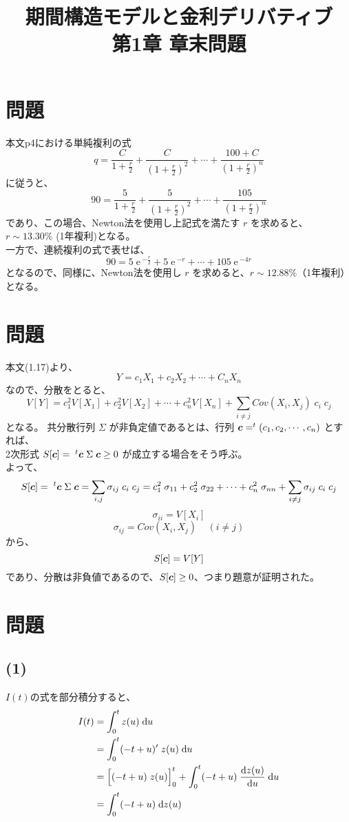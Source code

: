 \documentclass[a4j,10pt,oneside,openany]{jsbook}
\title{{\Huge \textbf{期間構造モデルと金利デリバティブ}}\\ {\small 第1章 \; 章末問題}}
\date{}
\newcommand{\diff}{\mathrm{d}}  %
\newcommand{\mexp}{\; \mathrm{e}\,}
\newcommand{\bvec}[1]{\mbox{\boldmath $#1$}} %
\begin{document}
%
%
\maketitle
%
%


\section*{問題 }
本文p4における単純複利の式
\[  q = \frac{C}{1+\frac{r}{2}} + \frac{C}{(1+\frac{r}{2})^2} + \cdots + \frac{100+C}{(1+\frac{r}{2})^n} \]
に従うと、
\[ 90 = \frac{5}{1+\frac{r}{2}} + \frac{5}{(1+\frac{r}{2})^2} + \cdots + \frac{105}{(1+\frac{r}{2})^n} \]
であり、この場合、Newton法を使用し上記式を満たす $r$ を求めると、$r \sim 13.30 \%$ (1年複利)となる。
\\
一方で、連続複利の式で表せば、
\[ 90 = 5 \mexp ^{-\frac{r}{2}} + 5 \mexp ^{-r} + \cdots + 105 \mexp ^{-4r} \]
となるので、同様に、Newton法を使用し $r$ を求めると、$r \sim 12.88 \%$（1年複利）となる。
\vspace{2\baselineskip}

\section*{問題 }
本文(1.17)より、
\[ Y = c_1 X_1 + c_2 X_2 + \cdots +C_n X_n \]
なので、分散をとると、
\[ V[Y] = c_{1}^{2} V[X_1] + c_{2}^{2} V[X_2] + \cdots + c_{n}^{2} V[X_n]+ \sum_{i \neq j } Cov(X_i , X_j) \; c_{i} \; c_{j} \]
となる。
共分散行列 $\Sigma$ が非負定値であるとは、行列 $\bvec{c} = ^{t} (c_1,c_2, \cdots , c_n)$ とすれば、\\
2次形式 $S[\bvec{c}] = \; ^{t} \bvec{c} \; \Sigma \; \bvec{c} \geq 0 $ が成立する場合をそう呼ぶ。\\
よって、
\[ S[\bvec{c}] = \; ^{t} \bvec{c} \; \Sigma \; \bvec{c} = \sum_{i,j} \sigma_{ij} \; c_{i} \; c_{j} =
c_{1}^{2} \; \sigma_{11} + c_{2}^{2} \; \sigma_{22} + \cdots + c_{n}^{2} \; \sigma_{nn}+ \sum_{i \neq j } \sigma_{ij} \; c_{i} \; c_{j} \]
\[ \sigma_{ii} = V[X_i] \]
\[ \sigma_{ij} = Cov(X_i , X_j) \; \; \; \; (i \neq j)\]
から、
\[ S[\bvec{c}] = V[Y] \]
であり、分散は非負値であるので、$S[\bvec{c}] \geq 0 $、つまり題意が証明された。
\vspace{2\baselineskip}

\section*{問題 }
\subsection*{(1)}
$I(t)$の式を部分積分すると、
\begin{align*}
 I(t)	&= \int^{t}_{0} z(u) \; {\diff}u \\
	&= \int^{t}_{0} (-t + u)^{\prime} \; z(u) \; {\diff}u \\
	&= \Big{[} (-t + u) \; z(u) \Big{]}^{t}_{0} + \int^{t}_{0} (-t + u) \; \frac{{\diff}z(u)}{{\diff}u} \; {\diff}u \\
	&= \int^{t}_{0} (-t + u) \; {\diff}z(u)
\end{align*}
\end{document}
